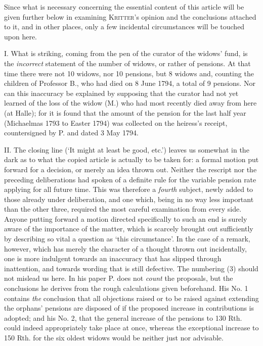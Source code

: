 \noindent\hspace*{\parindent}Since what is necessary concerning the essential content of this article will be given further below in examining \textsc{Kritter}'s opinion and the conclusions attached to it, and in other places, only a few incidental circumstances will be touched upon here.

I. What is striking, coming from the pen of the curator of the widows' fund, is the \textit{incorrect} statement of the number of widows, or rather of pensions. At that time there were not 10 widows, nor 10 pensions, but 8 widows and, counting the children of Professor B., who had died on 8 June 1794, a total of 9 pensions. Nor can this inaccuracy be explained by supposing that the curator had not yet learned of the loss of the widow (M.) who had most recently died away from here (at Halle); for it is found that the amount of the pension for the last half year (Michaelmas 1793 to Easter 1794) was collected on the heiress's receipt, countersigned by P. and dated 3 May 1794.

II. The closing line (‘It might at least be good, etc.’) leaves us somewhat in the dark as to what the copied article is actually to be taken for: a formal motion put forward for a decision, or merely an idea thrown out. Neither the rescript nor the preceding deliberations had spoken of a definite rule for the variable pension rate applying for all future time. This was therefore a \textit{fourth} subject, newly added to those already under deliberation, and one which, being in no way less important than the other three, required the most careful examination from every side. Anyone putting forward a motion directed specifically to such an end is surely aware of the importance of the matter, which is scarcely brought out sufficiently by describing so vital a question as ‘this circumstance’. In the case of a remark, however, which has merely the character of a thought thrown out incidentally, one is more indulgent towards an inaccuracy that has slipped through inattention, and towards wording that is still defective. The numbering (3) should not mislead us here. In his paper P. does not \textit{count} the proposals, but the conclusions he derives from the rough calculations given beforehand. His No. 1 contains \textit{the} conclusion that all objections raised or to be raised against extending the orphans' pensions are disposed of if the proposed increase in contributions is adopted; and his No. 2, that the general increase of the pensions to 130 Rth. could indeed appropriately take place at once, whereas the exceptional increase to 150 Rth. for the six oldest widows would be neither just nor advisable.

